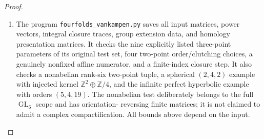 \begin{proof}
\begin{enumerate}[label={$\langle1\rangle$\arabic*.}]
\item The program \texttt{fourfolds\_vankampen.py} saves all input
matrices, power vectors, integral closure traces, group
extension data, and homology presentation matrices.
It checks the nine explicitly listed three-point parameters
of its original test set, four two-point order/clutching
choices, a genuinely nonfixed affine numerator, and a
finite-index closure step.  It also checks a nonabelian
rank-six two-point tuple, a spherical $(2,4,2)$ example
with injected kernel $\mathbb Z^2\oplus\mathbb Z/4$, and
the infinite perfect hyperbolic example with orders
$(5,4,19)$.  The nonabelian test deliberately belongs to
the full $\operatorname{GL}_6$ scope and has orientation-
reversing finite matrices; it is not claimed to admit a
complex compactification.  All bounds above depend on the input.

\end{enumerate}
\end{proof}




